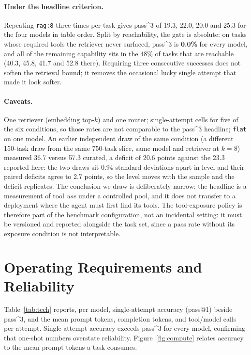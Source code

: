 \paragraph{Under the headline criterion.} Repeating \texttt{rag:8} three times
per task gives pass\textasciicircum{}3 of 19.3, 22.0, 20.0 and 25.3 for the four
models in table order. Split by reachability, the gate is absolute: on tasks
whose required tools the retriever never surfaced, pass\textasciicircum{}3 is
\textbf{0.0\%} for every model, and all of the remaining capability sits in the
48\% of tasks that are reachable (40.3, 45.8, 41.7 and 52.8 there). Requiring
three consecutive successes does not soften the retrieval bound; it removes the
occasional lucky single attempt that made it look softer.

\paragraph{Caveats.} One retriever (embedding top-$k$) and one router;
single-attempt cells for five of the six conditions, so those rates are not
comparable to the pass\textasciicircum{}3 headline;
\texttt{flat} on one model. An earlier independent draw of the same condition (a
different 150-task draw from the same 750-task slice, same model and retriever
at $k{=}8$) measured 36.7 versus 57.3 curated, a deficit of 20.6 points against
the 23.3 reported here: the two draws sit 0.94 standard deviations apart in
level and their paired deficits agree to 2.7 points, so the level moves with the
sample and the deficit replicates. The conclusion we draw is deliberately narrow: the headline is a
measurement of tool \emph{use} under a controlled pool, and it does not transfer
to a deployment where the agent must first find its tools. The tool-exposure
policy is therefore part of the benchmark configuration, not an incidental
setting: it must be versioned and reported alongside the task set, since a pass
rate without its exposure condition is not interpretable.

\section{Operating Requirements and Reliability}
\label{app:tech}
Table~\ref{tab:tech} reports, per model, single-attempt accuracy (pass@1)
beside pass\textasciicircum{}3, and the mean prompt tokens, completion tokens,
and tool/model calls per attempt. Single-attempt accuracy exceeds
pass\textasciicircum{}3 for every model, confirming that one-shot numbers
overstate reliability. Figure~\ref{fig:compute} relates accuracy to the mean
prompt tokens a task consumes.

